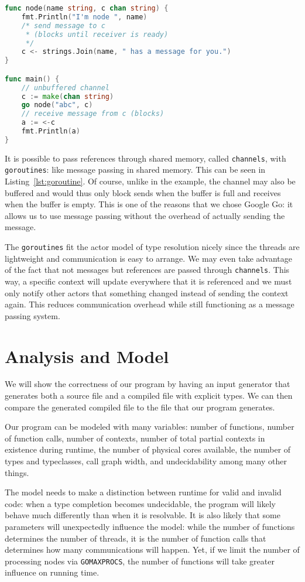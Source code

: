\documentclass{acm_proc_article-sp}
\begin{document}
\begin{lstlisting}[caption=Small \texttt{goroutine} example with
\texttt{channels},language=Go,label=lst:goroutine]
func node(name string, c chan string) {
	fmt.Println("I'm node ", name)
	/* send message to c
	 * (blocks until receiver is ready)
	 */
	c <- strings.Join(name, " has a message for you.")
}

func main() {
	// unbuffered channel
	c := make(chan string)
	go node("abc", c)
	// receive message from c (blocks)
	a := <-c
	fmt.Println(a)
}
\end{lstlisting}

It is possible to pass references through shared memory, called
\texttt{channels}, with \texttt{goroutines}: like message passing in shared
memory. This can be seen in Listing~\ref{lst:goroutine}. Of course, unlike in
the example, the channel may also be buffered and would thus only block sends
when the buffer is full and receives when the buffer is empty. This is one of
the reasons that we chose Google Go: it allows us to use message passing
without the overhead of actually sending the message.

The \texttt{goroutines} fit the actor model of type resolution nicely since
the threads are lightweight and communication is easy to arrange. We may even
take advantage of the fact that not messages but references are passed through
\texttt{channels}. This way, a specific context will update everywhere that it
is referenced and we must only notify other actors that something changed
instead of sending the context again. This reduces communication overhead while
still functioning as a message passing system.

\section{Analysis and Model}

We will show the correctness of our program by having an input generator that
generates both a source file and a compiled file with explicit types. We can
then compare the generated compiled file to the file that our program
generates. 

Our program can be modeled with many variables: number of functions, number of
function calls, number of contexts, number of total partial contexts in
existence during runtime, the number of physical cores available, the number of
types and typeclasses, call graph width, and undecidability among many other
things. 

The model needs to make a distinction between runtime for valid and invalid
code: when a type completion becomes undecidable, the program will likely
behave much differently than when it is resolvable. It is also likely that some
parameters will unexpectedly influence the model: while the number of functions
determines the number of threads, it is the number of function calls that
determines how many communications will happen. Yet, if we limit the number of
processing nodes via \texttt{GOMAXPROCS}, the number of functions will take
greater influence on running time.
\end{document}
